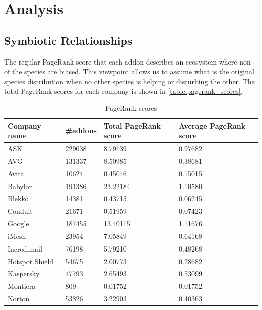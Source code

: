 \documentclass[11pt,oneside]{book}
\let\Oldsection\section
\renewcommand{\section}{\FloatBarrier\Oldsection}
\let\Oldsubsection\subsection
\renewcommand{\subsection}{\FloatBarrier\Oldsubsection}
\begin{document}
{{{{\section{Analysis}
\subsection{Symbiotic Relationships}
\label{sec:symb_relations}
The regular PageRank score that each addon describes an ecosystem where non of the species are biased. This viewpoint allows us to assume what is the original species distribution when no other species is helping or disturbing the other. The total PageRank scores for each company is shown in \autoref{table:pagerank_scores}.

\begin{table}[h]
\centering
\caption{PageRank scores}
\label{table:pagerank_scores}
\begin{tabular}{@{}llll@{}}
\toprule
Company name   & \#addons & Total PageRank score & Average PageRank score \\ \midrule
ASK            & 229038   & 8.79139              & 0.97682                \\
AVG            & 131337   & 8.50985              & 0.38681                \\
Avira          & 10624    & 0.45046              & 0.15015                \\
Babylon        & 191386   & 23.22184             & 1.10580                \\
Blekko         & 14381    & 0.43715              & 0.06245                \\
Conduit        & 21671    & 0.51959              & 0.07423                \\
Google         & 187455   & 13.40115             & 1.11676                \\
iMesh          & 23954    & 7.05849              & 0.64168                \\
Incredimail    & 76198    & 5.79210              & 0.48268                \\
Hotspot Shield & 54675    & 2.00773              & 0.28682                \\
Kaspersky      & 47793    & 2.65493              & 0.53099                \\
Montiera       & 809      & 0.01752              & 0.01752                \\
Norton         & 53826    & 3.22903              & 0.40363                \\

\end{tabular}
\end{table}}}}}
\end{document}
